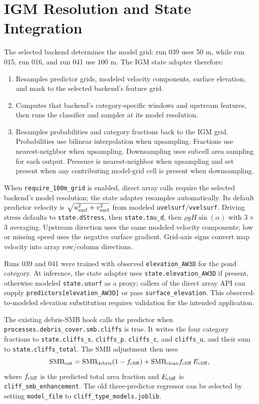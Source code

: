 \documentclass[11pt,a4paper]{article}
\begin{document}
\section{IGM Resolution and State Integration}
The selected backend determines the model grid: run 039 uses 50 m, while run
015, run 016, and run 041 use 100 m. The IGM state adapter therefore:
\begin{enumerate}
  \item Resamples predictor grids, modeled velocity components, surface elevation, and mask to the selected backend's feature grid.
  \item Computes that backend's category-specific windows and upstream features, then runs the classifier and sampler at its model resolution.
  \item Resamples probabilities and category fractions back to the IGM grid. Probabilities use bilinear interpolation when upsampling. Fractions use nearest-neighbor when upsampling. Downsampling uses subcell area sampling for each output. Presence is nearest-neighbor when upsampling and set present when any contributing model-grid cell is present when downsampling.
\end{enumerate}
When \texttt{require\_100m\_grid} is enabled, direct array calls require the
selected backend's model resolution; the state adapter resamples automatically.
Its default predictor velocity is
$\sqrt{u_{\rm surf}^2+v_{\rm surf}^2}$ from modeled
\texttt{uvelsurf}/\texttt{vvelsurf}. Driving stress defaults to
\texttt{state.dStress}, then \texttt{state.tau\_d}, then
$\rho gH\sin(\alpha)$ with 3\,$\times$\,3 averaging. Upstream direction uses the
same modeled velocity components; low or missing speed uses the negative
surface gradient. Grid-axis signs convert map velocity into array row/column
directions.

Runs 039 and 041 were trained with observed \texttt{elevation\_AW3D} for the
pond category. At inference, the state adapter uses
\texttt{state.elevation\_AW3D} if present, otherwise modeled
\texttt{state.usurf} as a proxy; callers of the direct array API can supply
\texttt{predictors[elevation\_AW3D]} or pass \texttt{surface\_elevation}. This
observed-to-modeled elevation substitution requires validation for the intended
application.

The existing debris-SMB hook calls the predictor when
\texttt{processes.debris\_cover.smb.cliffs} is true. It writes the four category
fractions to \texttt{state.cliffs\_s}, \texttt{cliffs\_p}, \texttt{cliffs\_c},
and \texttt{cliffs\_u}, and their sum to \texttt{state.cliffs\_total}. The SMB
adjustment then uses
\[
 \mathrm{SMB}_{\rm out}=\mathrm{SMB}_{\rm debris}(1-f_{\rm cliff})
 +\mathrm{SMB}_{\rm clean}f_{\rm cliff}\,E_{\rm cliff},
\]
where $f_{\rm cliff}$ is the predicted total area fraction and
$E_{\rm cliff}$ is \texttt{cliff\_smb\_enhancement}. The old three-predictor
regressor can be selected by setting \texttt{model\_file} to
\texttt{cliff\_type\_models.joblib}.
\end{document}
